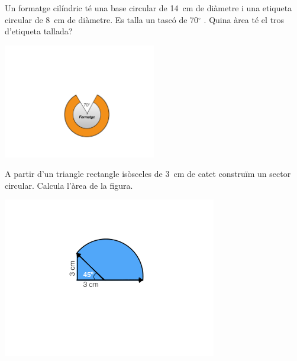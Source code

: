 \begin{mylist}
\vspace*{-1.5cm}
\exer \begin{minipage}[t]{0.7\textwidth}
	Un formatge cilíndric té una base circular de 14~cm de diàmetre i una etiqueta circular de 8~cm de diàmetre. Es talla un tascó de 70${}^\circ$ . Quina àrea té el tros d'etiqueta tallada? 
	
\end{minipage}
\begin{minipage}{0.3\textwidth}
	\centering
	\vspace{1.5cm}
	\includegraphics[width=0.5\textwidth]{img-09/formatge}
\end{minipage}
 
  
\pagebreak
\mbox{}
 
\vspace*{-1.5cm}
\exer[1] \begin{minipage}[t]{0.62\textwidth}
	A partir d'un triangle rectangle isòsceles de 3~cm de catet construïm un sector circular. Calcula l'àrea de la figura.
\end{minipage}
\begin{minipage}{0.3\textwidth}
	\centering
	\vspace{1.5cm}
	\includegraphics[width=0.7\textwidth]{img-09/fig14}
\end{minipage}
 

\end{mylist}
